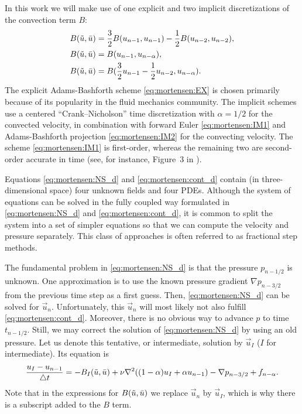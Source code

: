 In this work we will make use of one explicit and two implicit
discretizations of the convection term $B$:
\begin{align}
\label{eq:mortensen:EX}
B(\tilde{\vec{u}},\Bar{\vec{u}}) &=
\frac{3}{2}B(\vec{u}_{n-1},\vec{u}_{n-1})-
\frac{1}{2}B(\vec{u}_{n-2},\vec{u}_{n-2}),
\\
\label{eq:mortensen:IM1}
B(\tilde{\vec{u}},\Bar{\vec{u}}) &=
B(\vec{u}_{n-1},\vec{u}_{n-\alpha}),
\\
 \label{eq:mortensen:IM2}
B(\tilde{\vec{u}},\Bar{\vec{u}}) &=
B(\frac{3}{2}\vec{u}_{n-1}-\frac{1}{2}\vec{u}_{n-2},\vec{u}_{n-\alpha}).
\end{align}
The explicit Adams-Bashforth
scheme \eqref{eq:mortensen:EX} is chosen primarily because
of its popularity in the fluid mechanics community. The implicit
schemes use a centered ``Crank--Nicholson'' time discretization
with $\alpha=1/2$ for the convected velocity, in combination with
forward Euler \eqref{eq:mortensen:IM1} and Adams-Bashforth projection
\eqref{eq:mortensen:IM2} for the convecting velocity.
The scheme \eqref{eq:mortensen:IM1} is first-order, whereas the
remaining two are second-order accurate in time (see, for instance,
Figure~3 in \citet{SimoArmero1994}).

Equations \eqref{eq:mortensen:NS_d} and \eqref{eq:mortensen:cont_d}
contain (in three-dimensional space) four unknown fields and four PDEs.
Although the system of equations can be solved in the fully coupled way
formulated in \eqref{eq:mortensen:NS_d} and \eqref{eq:mortensen:cont_d},
it is common to split the system into a set of simpler equations so
that we can compute the velocity and pressure separately.  This class
of approaches is often referred to as fractional step methods.

The fundamental problem in \eqref{eq:mortensen:NS_d} is that the
pressure $p_{n-1/2}$ is unknown. One approximation is to use the
known pressure gradient $\nabla p_{n-3/2}$ from the previous time step
as a first guess. Then, \eqref{eq:mortensen:NS_d} can be solved for
$\vec{u}_n$. Unfortunately, this $\vec{u}_n$ will most likely not also
fulfill \eqref{eq:mortensen:cont_d}. Moreover, there is no obvious way
to advance $p$ to time $t_{n-1/2}$. Still, we may correct the solution
of \eqref{eq:mortensen:NS_d} by using an old pressure. Let us denote
this tentative, or intermediate, solution by $\vec{u}_I$ ($I$ for
intermediate). Its equation is
\begin{equation}
\label{eq:mortensen:NS_FS}
\frac{{\vec{u}}_{I}-\vec{u}_{n-1}}{\triangle t} =
- B_I(\tilde{\vec{u}},\Bar{\vec{u}}) +
\nu \nabla^2 ((1-\alpha) {\vec{u}}_{I} + \alpha \vec{u}_{n-1})
-\nabla p_{n-3/2} + f_{n-\alpha}.
\end{equation}
Note that in the expressions for $B(\tilde{\vec{u}},\Bar{\vec{u}})$ we
replace $\vec{u}_n$ by $\vec{u}_I$, which is why there is a subscript
added to the $B$ term.

